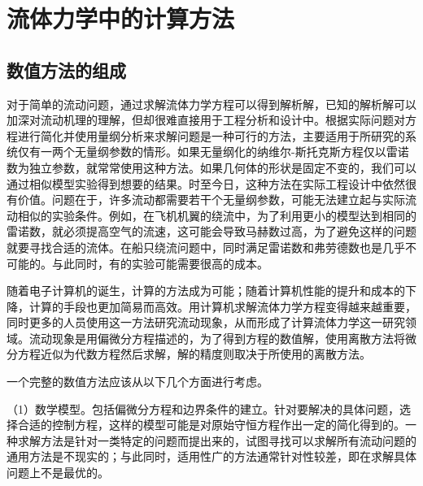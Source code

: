 

\chapter{流体力学中的计算方法}

\section{数值方法的组成}


对于简单的流动问题，通过求解流体力学方程可以得到解析解，已知的解析解可以加深对流动机理的理解，但却很难直接用于工程分析和设计中。根据实际问题对方程进行简化并使用量纲分析来求解问题是一种可行的方法，主要适用于所研究的系统仅有一两个无量纲参数的情形。如果无量纲化的纳维尔-斯托克斯方程仅以雷诺数为独立参数，就常常使用这种方法。如果几何体的形状是固定不变的，我们可以通过相似模型实验得到想要的结果。时至今日，这种方法在实际工程设计中依然很有价值。问题在于，许多流动都需要若干个无量纲参数，可能无法建立起与实际流动相似的实验条件。例如，在飞机机翼的绕流中，为了利用更小的模型达到相同的雷诺数，就必须提高空气的流速，这可能会导致马赫数过高，为了避免这样的问题就要寻找合适的流体。在船只绕流问题中，同时满足雷诺数和弗劳德数也是几乎不可能的。与此同时，有的实验可能需要很高的成本。

随着电子计算机的诞生，计算的方法成为可能；随着计算机性能的提升和成本的下降，计算的手段也更加简易而高效。用计算机求解流体力学方程变得越来越重要，同时更多的人员使用这一方法研究流动现象，从而形成了计算流体力学这一研究领域。流动现象是用偏微分方程描述的，为了得到方程的数值解，使用离散方法将微分方程近似为代数方程然后求解，解的精度则取决于所使用的离散方法。

一个完整的数值方法应该从以下几个方面进行考虑。

（1）数学模型。包括偏微分方程和边界条件的建立。针对要解决的具体问题，选择合适的控制方程，这样的模型可能是对原始守恒方程作出一定的简化得到的。一种求解方法是针对一类特定的问题而提出来的，试图寻找可以求解所有流动问题的通用方法是不现实的；与此同时，适用性广的方法通常针对性较差，即在求解具体问题上不是最优的。


